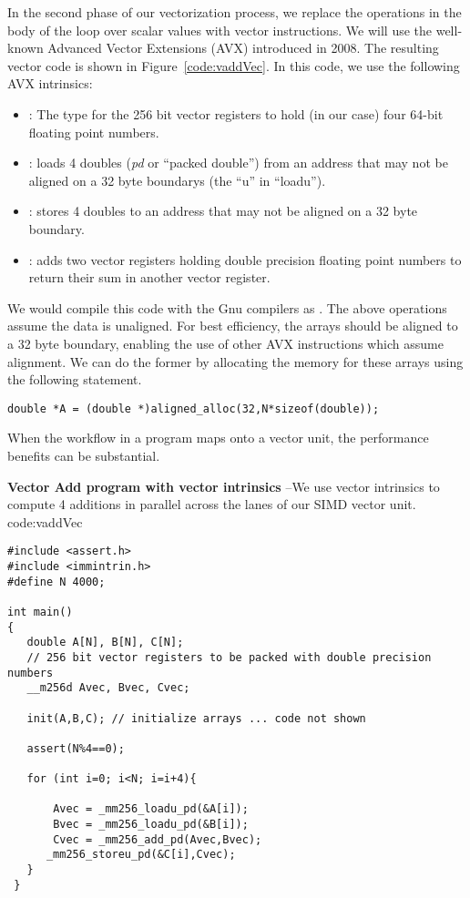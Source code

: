 In the second phase of our vectorization process, we replace the operations in the body of the loop over scalar values with vector instructions.
We will use the well-known Advanced Vector Extensions (AVX) introduced in 2008. The resulting vector code is
shown in Figure~\ref{code:vaddVec}.  In this code, we use the following AVX intrinsics:
\begin{itemize}
\item {}: The type for the 256 bit vector registers to hold (in our case) four 64-bit floating point numbers.
\item {}:  loads 4 doubles (\emph{pd} or ``packed double'') from an address that may not be aligned on a 32 byte boundarys (the ``u'' in ``loadu'').
\item {}:  stores 4 doubles to an address that may not be aligned on a 32 byte boundary.
\item {}: adds  two vector registers holding double precision floating point numbers to return 
their sum in another vector register.
\end{itemize}
We would compile this code with the Gnu compilers as .  The above operations assume the data is unaligned.  
For best efficiency, the arrays  should be 
aligned to a 32 byte boundary, enabling the use of other AVX instructions which assume alignment.
We can do the former by allocating the memory for these arrays using the following statement.
\begin{verbatim}
double *A = (double *)aligned_alloc(32,N*sizeof(double));
\end{verbatim}
When the workflow in a program maps onto a vector unit, the performance 
benefits can be substantial.

\begin{CodeExample}%
{\textbf{Vector Add program with vector intrinsics} --\small We use vector intrinsics to compute 
4 additions in parallel across the lanes of our SIMD vector unit. 
}%
{code:vaddVec}
\begin{lstlisting}
#include <assert.h>
#include <immintrin.h>
#define N 4000;

int main()
{
   double A[N], B[N], C[N];
   // 256 bit vector registers to be packed with double precision numbers
   __m256d Avec, Bvec, Cvec;    
     
   init(A,B,C); // initialize arrays ... code not shown
   
   assert(N%4==0);

   for (int i=0; i<N; i=i+4){

       Avec = _mm256_loadu_pd(&A[i]);
       Bvec = _mm256_loadu_pd(&B[i]);
       Cvec = _mm256_add_pd(Avec,Bvec);
      _mm256_storeu_pd(&C[i],Cvec);
   }
 }
\end{lstlisting}
\end{CodeExample}



